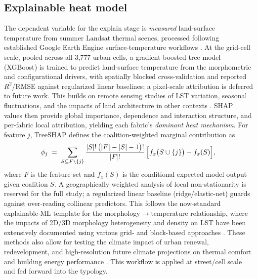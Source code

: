\subsection{Explainable heat model}
\label{sec:methods-explain}
The dependent variable for the explain stage is \emph{measured} land-surface
temperature from summer Landsat thermal scenes, processed following established
Google Earth Engine surface-temperature workflows
\citep{ravanelli2018MonitoriImpact, zhou2018SatellitRemote}. At the grid-cell scale,
pooled across all 3{,}777 urban cells, a gradient-boosted-tree model (XGBoost) is
trained to predict land-surface temperature
from the morphometric and configurational drivers, with spatially blocked
cross-validation and reported $R^2$/RMSE against regularized linear baselines; a
pixel-scale attribution is deferred to future work. This builds on remote sensing studies
of LST variation, seasonal fluctuations, and the impacts of land architecture in
other contexts \citep{li2016RemoteSensing, haashemi2016SeasonalVariatio,
jiang2015AssessinImpacts, ranagalage2020SpatioteVariatio}. SHAP values then provide
global importance, dependence and interaction structure, and per-fabric local
attribution, yielding each fabric's \emph{dominant heat mechanism}. For feature
$j$, TreeSHAP defines the coalition-weighted marginal contribution
\citep{lundberg2020LocalExplanations} as
\begin{equation}\label{eq:shap}
\phi_{j} \;=\; \sum_{S \subseteq F \setminus \{j\}}
\frac{|S|!\,\bigl(|F|-|S|-1\bigr)!}{|F|!}\,
\Bigl[ f_{x}\bigl(S \cup \{j\}\bigr) - f_{x}(S) \Bigr],
\end{equation}
where $F$ is the feature set and $f_x(S)$ is the conditional expected model
output given coalition $S$. A
geographically weighted analysis of local non-stationarity is reserved for the
full study; a regularized linear baseline (ridge/elastic-net) guards against over-reading
collinear predictors. This follows the now-standard explainable-ML template for
the morphology$\rightarrow$temperature relationship, where the impacts of 2D/3D
morphology heterogeneity and density on LST have been extensively documented using
various grid- and block-based approaches \citep{wangZ2025PlainPlateau,
liu2026Nonlinear, li2026BlockGrid, guo2016CharacteImpact, guo2020ImpactUrban,
huang2019InvestigEffects, li2020InfluencDensity, jeon2023ImpactsUrban,
taleghani2015OutdoorThermal}. These methods also allow for testing the
climate impact of urban renewal, redevelopment, and high-resolution future climate
projections on thermal comfort and building energy performance \citep{qiao2020ImpactUrban,
renard2019EvaluatiEffect, hosseini2022HighResoluti, kabano2021EvidenceUrban}. This
workflow is applied at street/cell scale and fed forward into the typology.


